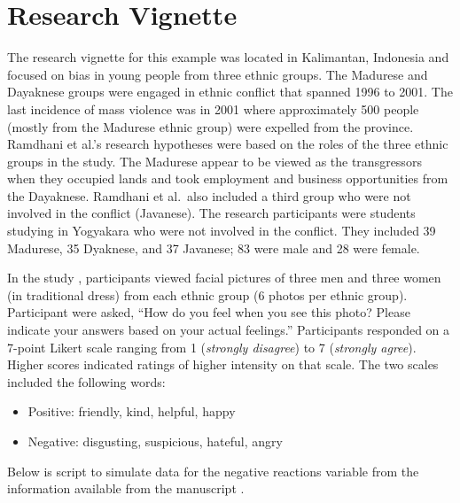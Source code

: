 \documentclass[
  11pt,
]{book}
\providecommand{\tightlist}{%
  \setlength{\itemsep}{0pt}\setlength{\parskip}{0pt}}
\begin{document}
\hypertarget{research-vignette-5}{%
\section{Research Vignette}\label{research-vignette-5}}

The research vignette for this example was located in Kalimantan, Indonesia and focused on bias in young people from three ethnic groups. The Madurese and Dayaknese groups were engaged in ethnic conflict that spanned 1996 to 2001. The last incidence of mass violence was in 2001 where approximately 500 people (mostly from the Madurese ethnic group) were expelled from the province. Ramdhani et al.'s \citeyearpar{ramdhani_affective_2018} research hypotheses were based on the roles of the three ethnic groups in the study. The Madurese appear to be viewed as the transgressors when they occupied lands and took employment and business opportunities from the Dayaknese. Ramdhani et al.~also included a third group who were not involved in the conflict (Javanese). The research participants were students studying in Yogyakara who were not involved in the conflict. They included 39 Madurese, 35 Dyaknese, and 37 Javanese; 83 were male and 28 were female.

In the study \citep{ramdhani_affective_2018}, participants viewed facial pictures of three men and three women (in traditional dress) from each ethnic group (6 photos per ethnic group). Participant were asked, ``How do you feel when you see this photo? Please indicate your answers based on your actual feelings.'' Participants responded on a 7-point Likert scale ranging from 1 (\emph{strongly disagree}) to 7 (\emph{strongly agree}). Higher scores indicated ratings of higher intensity on that scale. The two scales included the following words:

\begin{itemize}
\tightlist
\item
  Positive: friendly, kind, helpful, happy
\item
  Negative: disgusting, suspicious, hateful, angry
\end{itemize}

Below is script to simulate data for the negative reactions variable from the information available from the manuscript \citep{ramdhani_affective_2018}.
\end{document}

